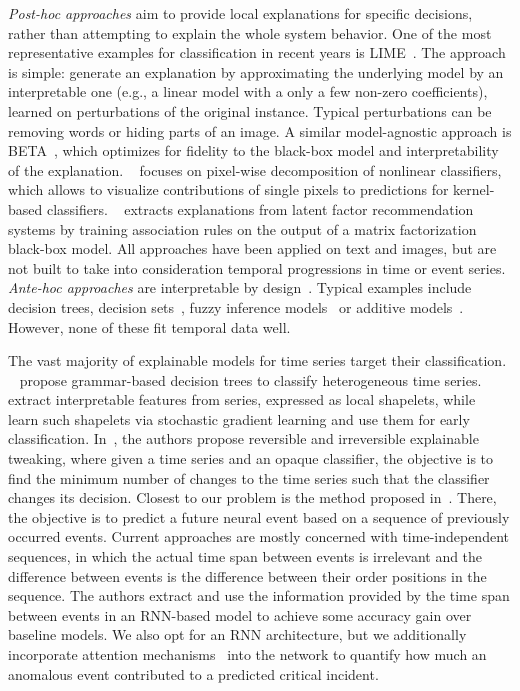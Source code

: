 \documentclass[letterpaper]{article} %
\begin{document}
\textit{Post-hoc approaches} aim to provide local explanations for specific decisions, rather than attempting to explain the whole system behavior. One of the most representative examples for classification in recent years is LIME~\cite{lime}. The approach is simple: generate an explanation by approximating the underlying model by an interpretable one (e.g., a linear model with a only a few non-zero coefficients), learned on perturbations of the original instance. Typical perturbations can be removing words or hiding parts of an image. A similar model-agnostic approach is BETA~\cite{approximations}, which optimizes for fidelity to the black-box model and interpretability of the explanation. ~\cite{layerwise} focuses on pixel-wise decomposition of nonlinear classifiers, which allows to visualize contributions of single pixels to predictions for kernel-based classifiers. ~\cite{mining} extracts explanations from latent factor recommendation systems by training association rules on the output of a matrix factorization black-box model. All approaches have been applied on text and images, but are not built to take into consideration temporal progressions in time or event series.  \textit{Ante-hoc approaches} are interpretable by design~\cite{nphard}. Typical examples include decision trees, decision sets~\cite{decisionsets,anchors}, fuzzy inference models~\cite{pairwise} or additive models~\cite{additive}. However, none of these fit temporal data well.

\vspace{-1.28mm}
\vspace{-2.56mm}
The vast majority of explainable models for time series target their classification. ~\cite{categorization} propose grammar-based decision trees to classify heterogeneous time series.
~\cite{earlyclass,shapelets} extract interpretable features from series, expressed as local shapelets, while ~\cite{dtw} learn such shapelets via stochastic gradient learning and use them for early classification. In~\cite{irreversible}, the authors propose reversible and irreversible explainable tweaking, where given a time series and an opaque classifier, the objective is to find the minimum number of changes to the time series such that the classifier changes its decision.  Closest to our problem is the method proposed in~\cite{iclr2018}. There, the objective is to predict a future neural event based on a sequence of previously occurred events. Current approaches are mostly concerned with time-independent sequences, in which the actual time span between events is irrelevant and the difference between events is the difference between their order positions in the sequence. The authors extract and use the information provided by the time span between events in an RNN-based model to achieve some accuracy gain over baseline models. We also opt for an RNN architecture, but we additionally incorporate attention mechanisms~\cite{attention} into the network to quantify how much an anomalous event contributed to a predicted critical incident.
\end{document}
